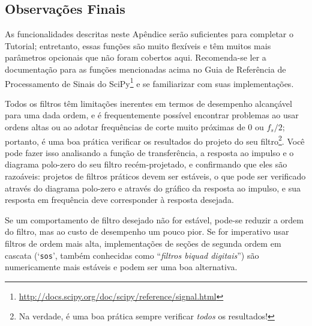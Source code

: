 \documentclass[a4paper,twoside,12pt]{article}
\begin{document}
	
	\subsection{Observações Finais}
	
	As funcionalidades descritas neste Apêndice serão suficientes para completar o Tutorial; entretanto, essas funções são muito flexíveis e têm muitos mais parâmetros opcionais que não foram cobertos aqui. Recomenda-se ler a documentação para as funções mencionadas acima no Guia de Referência de Processamento de Sinais do SciPy\footnote{\url{http://docs.scipy.org/doc/scipy/reference/signal.html}} e se familiarizar com suas implementações.
	
	Todos os filtros têm limitações inerentes em termos de desempenho alcançável para uma dada ordem, e é frequentemente possível encontrar problemas ao usar ordens altas ou ao adotar frequências de corte muito próximas de $0$ ou $f_s/2$; portanto, é uma boa prática verificar os resultados do projeto do seu filtro\footnote{Na verdade, é uma boa prática sempre verificar \emph{todos} os resultados!}. Você pode fazer isso analisando a função de transferência, a resposta ao impulso e o diagrama polo-zero do seu filtro recém-projetado, e confirmando que eles são razoáveis: projetos de filtros práticos devem ser estáveis, o que pode ser verificado através do diagrama polo-zero e através do gráfico da resposta ao impulso, e sua resposta em frequência deve corresponder à resposta desejada.
	
	Se um comportamento de filtro desejado não for estável, pode-se reduzir a ordem do filtro, mas ao custo de desempenho um pouco pior. Se for imperativo usar filtros de ordem mais alta, implementações de seções de segunda ordem em cascata (`{\tt sos}', também conhecidas como ``\emph{filtros biquad digitais}'') são numericamente mais estáveis e podem ser uma boa alternativa.
	
	
	
\end{document}
